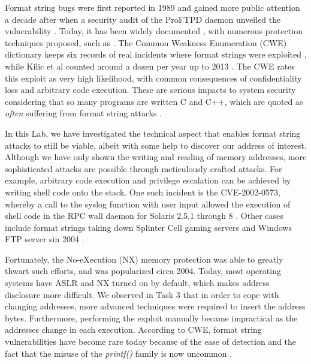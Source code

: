 
Format string bugs were first reported in 1989 \cite{Miller1990} and gained more public attention a decade after when a security audit of the ProFTPD daemon unveiled the vulnerability \cite{tymm1999}. Today, it has been widely documented \cite{fsa_owasp, Weitz2014, arbaugh1997automated, scut2001}, with numerous protection techniques proposed, such as \cite{Shankar2001, cowan2002}. The Common Weakness Enumeration (CWE) dictionary keeps six records of real incidents where format strings were exploited \cite{fsa_cwe}, while Kilic et al counted around a dozen per year up to 2013 \cite{Kilic2015}. The CWE rates this exploit as very high likelihood, with common consequences of confidentiality loss and arbitrary code execution. These are serious impacts to system security considering that so many programs are written C and C++, which are quoted as \emph{often} suffering from format string attacks \cite{fsa_cwe}.

In this Lab, we have investigated the technical aspect that enables format string attacks to still be viable, albeit with some help to discover our address of interest. Although we have only shown the writing and reading of memory addresses, more sophisticated attacks are possible through meticulously crafted attacks. For example, arbitrary code execution and privilege escalation can be achieved by writing shell code onto the stack. One such incident is the CVE-2002-0573, whereby a call to the syslog function with user input allowed the execution of shell code in the RPC wall daemon for Solaris 2.5.1 through 8 \cite{cve-solaris2002}. Other cases include format strings taking down Splinter Cell gaming servers \cite{Auriemma} and Windows FTP server sin 2004 \cite{Winter-Smith2004}.

Fortunately, the No-eXecution (NX) memory protection was able to greatly thwart such efforts, and was popularized circa 2004. Today, most operating systems have ASLR and NX turned on by default, which makes address disclosure more difficult. We observed in Task 3 that in order to cope with changing addresses, more advanced techniques were required to insert the address bytes. Furthermore, performing the exploit manually became impractical as the addresses change in each execution. According to CWE, format string vulnerabilities have become rare today because of the ease of detection and the fact that the misuse of the \emph{printf()} family is now uncommon \cite{fsa_cwe}.

